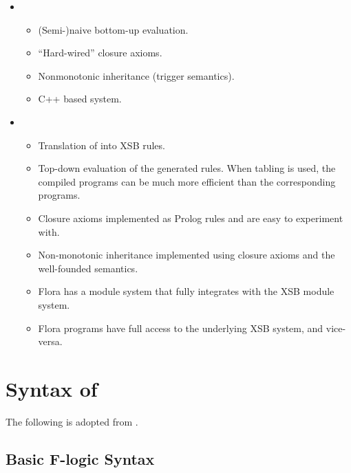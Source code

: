 \documentclass[11pt]{report}
\begin{document}
\begin{itemize}
\item \FLORID
  \begin{itemize}
  \item (Semi-)naive bottom-up evaluation.
  \item ``Hard-wired'' closure axioms.
  \item Nonmonotonic inheritance (trigger semantics).
  \item C++ based system.
  \end{itemize}
\item \FLORA
  \begin{itemize}
  \item Translation of \fl into XSB rules.
  \item Top-down evaluation of the generated rules. When tabling is used,
    the compiled programs can be much more efficient than the corresponding
    \FLORID programs.
  \item Closure axioms implemented as Prolog rules and are easy to
    experiment with.
  \item Non-monotonic inheritance implemented using closure axioms and the
    well-founded semantics.
  \item Flora has a module system that fully integrates with the XSB module
    system.
  \item Flora programs have full access to the underlying XSB system, and
    vice-versa.
  \end{itemize}
\end{itemize}



\section{Syntax of \FLORA}

The following is adopted from \cite{ludaescher-himmeroeder-IS-98}.


\subsection{Basic F-logic Syntax}\label{sec-basic-flogic}
\end{document}
